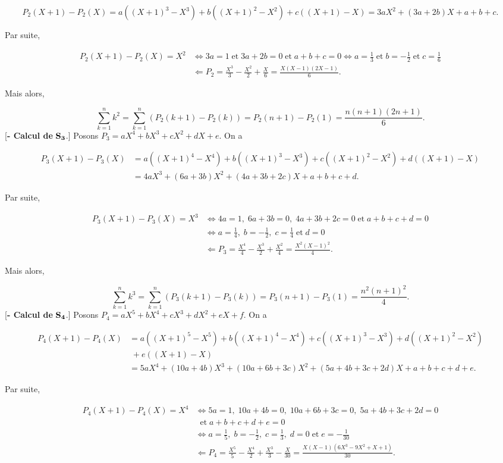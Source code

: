 {\begin{enumerate}
{\begin{itemize}
$$P_2(X+1)-P_2(X)=a((X+1)^3-X^3)+b((X+1)^2-X^2)+c((X+1)-X)=3aX^2+(3a+2b)X+a+b+c.$$

Par suite,

\begin{align*}
P_2(X+1)-P_2(X)=X^2&\Leftrightarrow 3a=1\;\mbox{et}\;3a+2b=0\;\mbox{et}\;a+b+c=0\Leftrightarrow
a=\frac{1}{3}\;\mbox{et}\;b=-\frac{1}{2}\;\mbox{et}\;c=\frac{1}{6}\\
 &\Leftarrow P_2=\frac{X^3}{3}-\frac{X^2}{2}+\frac{X}{6}=\frac{X(X-1)(2X-1)}{6}.
\end{align*}

Mais alors,

$$\sum_{k=1}^{n}k^2=\sum_{k=1}^{n}(P_2(k+1)-P_2(k))=P_2(n+1)-P_2(1)=\frac{n(n+1)(2n+1)}{6}.$$
[\textbf{- Calcul de} $\bf{S_3}$.] Posons $P_3=aX^4+bX^3+cX^2+dX+e$. On a

\begin{align*}
P_3(X+1)-P_3(X)&=a((X+1)^4-X^4)+b((X+1)^3-X^3)+c((X+1)^2-X^2)+d((X+1)-X)\\
 &=4aX^3+(6a+3b)X^2+(4a+3b+2c)X+a+b+c+d.
\end{align*}

Par suite,

\begin{align*}
P_3(X+1)-P_3(X)=X^3&\Leftrightarrow4a=1,\;6a+3b=0,\;4a+3b+2c=0\;\mbox{et}\;a+b+c+d=0\\
 &\Leftrightarrow
a=\frac{1}{4},\;b=-\frac{1}{2},\;c=\frac{1}{4}\;\mbox{et}\;d=0\\
 &\Leftarrow P_3=\frac{X^4}{4}-\frac{X^3}{2}+\frac{X^2}{4}=\frac{X^2(X-1)^2}{4}.
\end{align*}

Mais alors,

$$\sum_{k=1}^{n}k^3=\sum_{k=1}^{n}(P_3(k+1)-P_3(k))=P_3(n+1)-P_3(1)=\frac{n^2(n+1)^2}{4}.$$
[\textbf{- Calcul de} $\bf{S_4}$.] Posons $P_4=aX^5+bX^4+cX^3+dX^2+eX+f$. On a

\begin{align*}
P_4(X+1)-P_4(X)&=a((X+1)^5-X^5)+b((X+1)^4-X^4)+c((X+1)^3-X^3)+d((X+1)^2-X^2)\\
 &\;+e((X+1)-X)\\
 &=5aX^4+(10a+4b)X^3+(10a+6b+3c)X^2+(5a+4b+3c+2d)X+a+b+c+d+e.
\end{align*}

Par suite,

\begin{align*}
P_4(X+1)-P_4(X)=X^4&\Leftrightarrow5a=1,\;10a+4b=0,\;10a+6b+3c=0,\;5a+4b+3c+2d=0\\
 &\;\;\mbox{et}\;a+b+c+d+e=0\\
 &\Leftrightarrow
a=\frac{1}{5},\;b=-\frac{1}{2},\;c=\frac{1}{3},\;d=0\;\mbox{et}\;e=-\frac{1}{30}\\
 &\Leftarrow P_4=\frac{X^5}{5}-\frac{X^4}{2}+\frac{X^3}{3}-\frac{X}{30}=\frac{X(X-1)(6X^3-9X^2+X+1)}{30}.
\end{align*}


\end{itemize}}
\end{enumerate}}

